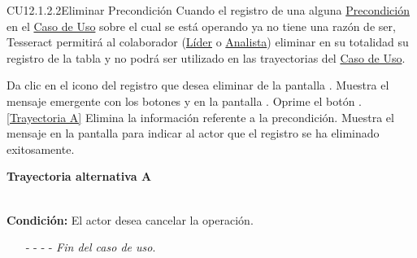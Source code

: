 	\begin{UseCase}{CU12.1.2.2}{Eliminar Precondición}{
			Cuando el registro de una  alguna \hyperlink{entidadPrecondicion}{Precondición} en el \hyperlink{casoUso}{Caso de Uso} sobre el cual se está operando ya no tiene una razón de ser, Tesseract permitirá al colaborador (\hyperlink{jefe}{Líder} o \hyperlink{analista}{Analista}) eliminar en su totalidad su registro de la tabla y no podrá ser utilizado en las trayectorias del \hyperlink{casoUso}{Caso de Uso}.
	}
\end{UseCase}
\begin{UCtrayectoria}
	\UCpaso[\UCactor] Da clic en el icono \eliminar del registro que desea eliminar de la pantalla .
	\UCpaso[\UCsist] Muestra el mensaje emergente  con los botones  y  en la pantalla .
	\UCpaso[\UCactor] Oprime el botón . \hyperlink{CU12-1-2-2:TAA}{[Trayectoria A]}
	\UCpaso[\UCsist] Elimina la información referente a la precondición.
	\UCpaso[\UCsist] Muestra el mensaje  en la pantalla  para indicar al actor que el registro se ha eliminado exitosamente.
\end{UCtrayectoria}		
\hypertarget{CU12-1-2-2:TAA}{\textbf{Trayectoria alternativa A}}\\
\noindent \textbf{Condición:} El actor desea cancelar la operación.
\begin{enumerate}
	\UCpaso[\UCactor] Solicita cancelar la operación oprimiendo el botón  de la pantalla .
	\UCpaso[\UCsist] Muestra la pantalla .
	\item[- -] - - {\em {Fin del caso de uso}}.%
\end{enumerate}



